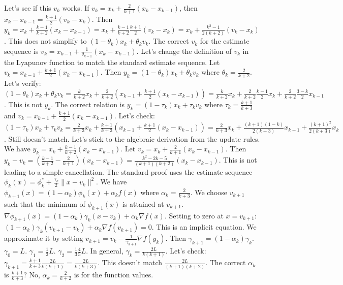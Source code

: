\documentclass{article}
\begin{document}
Let's see if this $v_k$ works. If $v_k = x_k + \frac{2}{k+1}(x_k - x_{k-1})$, then $x_k - x_{k-1} = \frac{k+1}{2}(v_k - x_k)$.
Then $y_k = x_k + \frac{k-1}{k+2}(x_k - x_{k-1}) = x_k + \frac{k-1}{k+2}\frac{k+1}{2}(v_k - x_k) = x_k + \frac{k^2-1}{2(k+2)}(v_k - x_k)$.
This does not simplify to $(1-\theta_k)x_k + \theta_k v_k$.
The correct $v_k$ for the estimate sequence is $v_k = x_{k-1} + \frac{1}{\theta_{k-1}}(x_k - x_{k-1})$.
Let's change the definition of $v_k$ in the Lyapunov function to match the standard estimate sequence.
Let $v_k = x_{k-1} + \frac{k+1}{2}(x_k - x_{k-1})$.
Then $y_k = (1-\theta_k)x_k + \theta_k v_k$ where $\theta_k = \frac{2}{k+2}$.
Let's verify: $(1-\theta_k)x_k + \theta_k v_k = \frac{k}{k+2}x_k + \frac{2}{k+2}\left(x_{k-1} + \frac{k+1}{2}(x_k - x_{k-1})\right) = \frac{k}{k+2}x_k + \frac{2}{k+2}\frac{k-1}{2}x_k + \frac{2}{k+2}\frac{3-k}{2}x_{k-1}$. This is not $y_k$.
The correct relation is $y_k = (1-\tau_k) x_k + \tau_k v_k$ where $\tau_k = \frac{k+1}{k+3}$ and $v_k = x_{k-1} + \frac{k+1}{2}(x_k - x_{k-1})$.
Let's check: $(1-\tau_k) x_k + \tau_k v_k = \frac{2}{k+3}x_k + \frac{k+1}{k+3}\left(x_{k-1} + \frac{k+1}{2}(x_k - x_{k-1})\right) = \frac{2}{k+3}x_k + \frac{(k+1)(1-k)}{2(k+3)}x_{k-1} + \frac{(k+1)^2}{2(k+3)}x_k$. Still doesn't match.
Let's stick to the algebraic derivation from the update rules.
We have $y_k = x_k + \frac{k-1}{k+2}(x_k - x_{k-1})$.
Let $v_k = x_k + \frac{2}{k+1}(x_k - x_{k-1})$.
Then $y_k - v_k = \left(\frac{k-1}{k+2} - \frac{2}{k+1}\right)(x_k - x_{k-1}) = \frac{k^2-2k-5}{(k+1)(k+2)}(x_k - x_{k-1})$.
This is not leading to a simple cancellation.
The standard proof uses the estimate sequence $\phi_k(x) = \phi_k^* + \frac{\gamma_k}{2}\|x - v_k\|^2$.
We have $\phi_{k+1}(x) = (1-\alpha_k)\phi_k(x) + \alpha_k f(x)$ where $\alpha_k = \frac{2}{k+3}$.
We choose $v_{k+1}$ such that the minimum of $\phi_{k+1}(x)$ is attained at $v_{k+1}$.
$\nabla \phi_{k+1}(x) = (1-\alpha_k)\gamma_k(x - v_k) + \alpha_k \nabla f(x)$.
Setting to zero at $x = v_{k+1}$: $(1-\alpha_k)\gamma_k(v_{k+1} - v_k) + \alpha_k \nabla f(v_{k+1}) = 0$.
This is an implicit equation. We approximate it by setting $v_{k+1} = v_k - \frac{1}{\gamma_{k+1}} \nabla f(y_k)$.
Then $\gamma_{k+1} = (1-\alpha_k)\gamma_k$.
$\gamma_0 = L$. $\gamma_1 = \frac{1}{3}L$. $\gamma_2 = \frac{1}{3} \frac{4}{5} L$.
In general, $\gamma_k = \frac{2L}{k(k+1)}$.
Let's check: $\gamma_{k+1} = \frac{k+1}{k+3} \frac{2L}{k(k+1)} = \frac{2L}{k(k+3)}$. This doesn't match $\frac{2L}{(k+1)(k+2)}$.
The correct $\alpha_k$ is $\frac{k+1}{k+3}$? No, $\alpha_k = \frac{2}{k+2}$ is for the function values.
\end{document}
